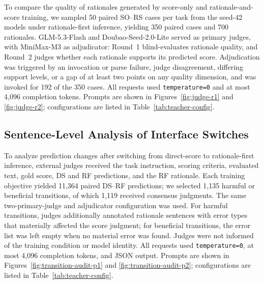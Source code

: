 To compare the quality of rationales generated by score-only and
rationale-and-score training, we sampled 50 paired SO--RS cases per task
from the seed-42 models under rationale-first inference, yielding 350
paired cases and 700 rationales. GLM-5.3-Flash and Doubao-Seed-2.0-Lite
served as primary judges, with MiniMax-M3 as adjudicator: Round~1
blind-evaluates rationale quality, and Round~2 judges whether each
rationale supports its predicted score. Adjudication was triggered by an
invocation or parse failure, judge disagreement, differing support levels,
or a gap of at least two points on any quality dimension, and was invoked
for 192 of the 350 cases. All requests used \texttt{temperature=0} and at
most 4{,}096 completion tokens. Prompts are shown in
Figures~\ref{fig:judge-r1} and \ref{fig:judge-r2}; configurations are
listed in Table~\ref{tab:teacher-config}.

\subsection{Sentence-Level Analysis of Interface Switches}
\label{app:sentence-level-analysis}


To analyze prediction changes after switching from direct-score to
rationale-first inference, external judges received the task instruction,
scoring criteria, evaluated text, gold score, DS and RF predictions, and
the RF rationale. Each training objective yielded 11{,}364 paired DS--RF
predictions; we selected 1{,}135 harmful or beneficial transitions, of
which 1{,}119 received consensus judgments. The same two-primary-judge and
adjudicator configuration was used. For harmful transitions, judges
additionally annotated rationale sentences with error types that
materially affected the score judgment; for beneficial transitions, the
error list was left empty when no material error was found. Judges were
not informed of the training condition or model identity. All requests
used \texttt{temperature=0}, at most 4{,}096 completion tokens, and JSON
output. Prompts are shown in Figures~\ref{fig:transition-audit-p1}
and \ref{fig:transition-audit-p2}; configurations are listed in
Table~\ref{tab:teacher-config}.
